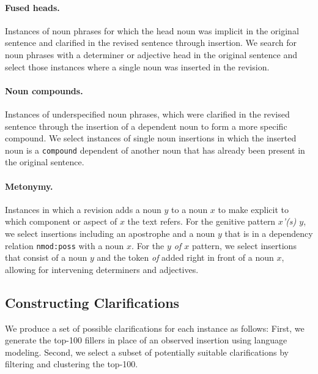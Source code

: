 \documentclass[11pt]{article}
\begin{document}
\paragraph{Fused heads.} Instances of noun phrases for which the head noun was implicit in the original sentence and clarified in the revised sentence through insertion. We search for noun phrases with a determiner or adjective head in the original sentence and select those instances where a single noun was inserted in the revision.
\paragraph{Noun compounds.} Instances of underspecified noun phrases, which were clarified in the revised sentence through the insertion of a dependent noun to form a more specific compound. We select instances of single noun insertions in which the inserted noun is a \texttt{compound} dependent of another noun that has already been present in the original sentence.

\paragraph{Metonymy.} Instances in which a revision adds a noun $y$ to a noun $x$ to make explicit to which component or aspect of $x$ the text refers. For the genitive pattern \textit{$x$'(s) $y$}, we select insertions including an apostrophe and a noun $y$ that is in a dependency relation \texttt{nmod:poss} with a noun $x$. For the \textit{$y$ of $x$} pattern, we select insertions that consist of a noun $y$ and the token \textit{of} added right in front of a noun $x$, allowing for intervening determiners and adjectives.

\subsection{Constructing Clarifications}
\label{subsec:step2}

We produce a set of possible clarifications for each instance as follows: First, we generate the top-100 fillers in place of an observed insertion using 
language modeling. Second, we select a subset of potentially suitable clarifications by filtering and clustering the top-100.  
\end{document}
